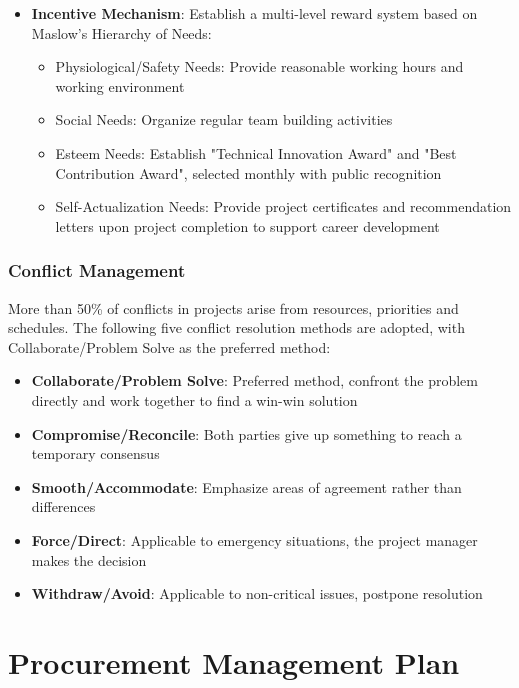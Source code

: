 \documentclass[12pt,a4paper]{article}
\begin{document}
\begin{itemize}
  \item \textbf{Incentive Mechanism}: Establish a multi-level reward system based on Maslow's Hierarchy of Needs:
  \begin{itemize}
    \item Physiological/Safety Needs: Provide reasonable working hours and working environment
    \item Social Needs: Organize regular team building activities
    \item Esteem Needs: Establish "Technical Innovation Award" and "Best Contribution Award", selected monthly with public recognition
    \item Self-Actualization Needs: Provide project certificates and recommendation letters upon project completion to support career development
  \end{itemize}
\end{itemize}

\subsubsection{Conflict Management}
More than 50\% of conflicts in projects arise from resources, priorities and schedules. The following five conflict resolution methods are adopted, with Collaborate/Problem Solve as the preferred method:
\begin{itemize}[leftmargin=*]
    \item \textbf{Collaborate/Problem Solve}: Preferred method, confront the problem directly and work together to find a win-win solution
    \item \textbf{Compromise/Reconcile}: Both parties give up something to reach a temporary consensus
    \item \textbf{Smooth/Accommodate}: Emphasize areas of agreement rather than differences
    \item \textbf{Force/Direct}: Applicable to emergency situations, the project manager makes the decision
    \item \textbf{Withdraw/Avoid}: Applicable to non-critical issues, postpone resolution
\end{itemize}

\clearpage
\section{Procurement Management Plan}
\end{document}
